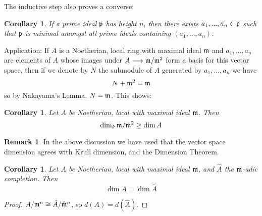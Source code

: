 \documentclass[12pt]{article}
\theoremstyle{plain}
\newtheorem{cor}[thm]{Corollary}
\theoremstyle{definition}
\newtheorem{remark}[thm]{Remark}
\newcommand{\lto}{\longrightarrow}
\begin{document}
	The inductive step also proves a converse:
	\begin{cor}
		If a prime ideal $\frak{p}$ has height $n$, then there exists $a_1,...,a_n \in \frak{p}$ such that $\frak{p}$ is minimal amongst all prime ideals containing $(a_1,...,a_n)$.
	\end{cor}
	Application: If $A$ is a Noetherian, local ring with maximal ideal $\frak{m}$ and $a_1,...,a_n$ are elements of $A$ whose images under $A \lto \frak{m}/\frak{m}^2$ form a basis for this vector space, then if we denote by $N$ the submodule of $A$ generated by $a_1,...,a_n$ we have
	\[N + \frak{m}^2 = \frak{m}\]
	so by Nakayama's Lemma, $N = \frak{m}$. This shows:
	\begin{cor}
		Let $A$ be Noetherian, local with maximal ideal $\frak{m}$. Then
		\[\operatorname{dim}_k\frak{m}/\frak{m}^2 \geq \operatorname{dim}A\]
	\end{cor}
	\begin{remark}
		In the above discussion we have used that the vector space dimension agrees with Krull dimension, and the Dimension Theorem.
	\end{remark}
	\begin{cor}
		Let $A$ be Noetherian, local with maximal ideal $\frak{m}$, and $\hat{A}$ the $\frak{m}$-adic completion. Then
		\[\operatorname{dim}A = \operatorname{dim}\hat{A}\]
	\end{cor}
	\begin{proof}
		$A/\frak{m}^n \cong \hat{A}/\hat{\frak{m}}^n$, so $d(A) = d(\hat{A})$.
	\end{proof}
\end{document}
